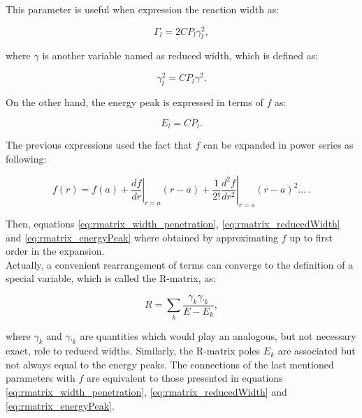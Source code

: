 \documentclass[openany]{book}
\begin{document}
This parameter is useful when expression the reaction width as: 

\begin{equation}   \label{eq:rmatrix_width_penetration}
	\Gamma_l = 2CP_l\gamma^2_l,
\end{equation}

where $\gamma$ is another variable named as reduced width,  which is defined as: 

\begin{equation}   \label{eq:rmatrix_reducedWidth}
	\gamma^2_l =C P_l\gamma^2.
\end{equation}

On the other hand, the energy peak is expressed in terms of $f$ as: 

\begin{equation}  \label{eq:rmatrix_energyPeak}
	E_l =  C P_l.
\end{equation}

The previous expressions used the fact that $f$ can be expanded in power series as following: 

\begin{equation}   \label{eq:rmatrix_f_powerSeries}
	f(r) = f(a) + \left.\frac{df}{dr}\right|_{r = a} (r - a) +  \frac{1}{2!} \left.\frac{d^2f}{dr^2}\right|_{r = a} (r - a )^2  ... \ .
\end{equation}

Then, equations \ref{eq:rmatrix_width_penetration},     \ref{eq:rmatrix_reducedWidth} and \ref{eq:rmatrix_energyPeak} where obtained by approximating $f$ up to first order in the expansion.\\

Actually, a convenient rearrangement of terms can converge to the definition of a special variable, which is called the R-matrix, as: 

\begin{equation}  \label{eq:rmatrix_definition1}
	R= \sum_k {\frac{\gamma_{k} \gamma_{'k}}{E - E_k}}, 
\end{equation}

where $\gamma_{k} $ and $\gamma_{'k}$ are quantities which would play an analogous, but not necessary exact, role to reduced widths. Similarly, the R-matrix poles $E_k$ are associated but not always equal to the energy peaks. The connections of the last mentioned parameters with $f$ are equivalent to those presented in equations \ref{eq:rmatrix_width_penetration},     \ref{eq:rmatrix_reducedWidth} and \ref{eq:rmatrix_energyPeak}.   \\
\end{document}
